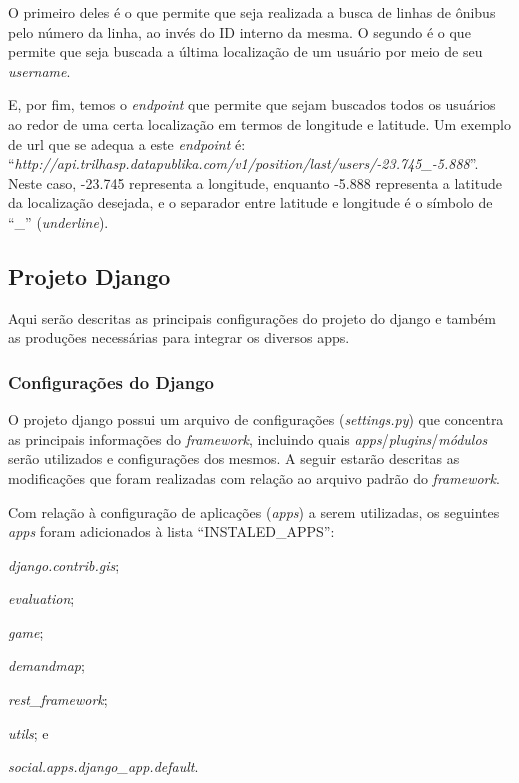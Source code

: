 O primeiro deles é o que permite que seja realizada a busca de linhas de ônibus pelo número da linha, ao invés do ID interno da mesma. O segundo é o que permite que seja buscada a última localização de um usuário por meio de seu \textit{username}.

E, por fim, temos o \textit{endpoint} que permite que sejam buscados todos os usuários ao redor de uma certa localização em termos de longitude e latitude. Um exemplo de url que se adequa a este \textit{endpoint} é:
``\textit{http://api.trilhasp.datapublika.com/v1/position/last/users/-23.745\_-5.888}''. Neste caso, -23.745 representa a longitude, enquanto -5.888 representa a latitude da localização desejada, e o separador entre latitude e longitude é o símbolo de ``\_'' (\textit{underline}).

\subsection{Projeto Django}
Aqui serão descritas as principais configurações do projeto do \gls{django} e também as produções necessárias para integrar os diversos apps.

\subsubsection{Configurações do Django}
O projeto \gls{django} possui um arquivo de configurações (\textit{settings.py}) que concentra as principais informações do \textit{framework}, incluindo quais \textit{apps}/\textit{plugins}/\textit{módulos} serão utilizados e configurações dos mesmos. A seguir estarão descritas as modificações que foram realizadas com relação ao arquivo padrão do \textit{framework}.

Com relação à configuração de aplicações (\textit{apps}) a serem utilizadas, os seguintes \textit{apps} foram adicionados à lista ``INSTALED\_APPS'':
    \begin{enumerate*}[label=\itshape\alph*\upshape)]
        \item \textit{django.contrib.gis};
        \item \textit{evaluation};
        \item \textit{game};
        \item \textit{demandmap};
        \item \textit{rest\_framework};
        \item \textit{utils}; e
        \item \textit{social.apps.django\_app.default}.
    \end{enumerate*}

